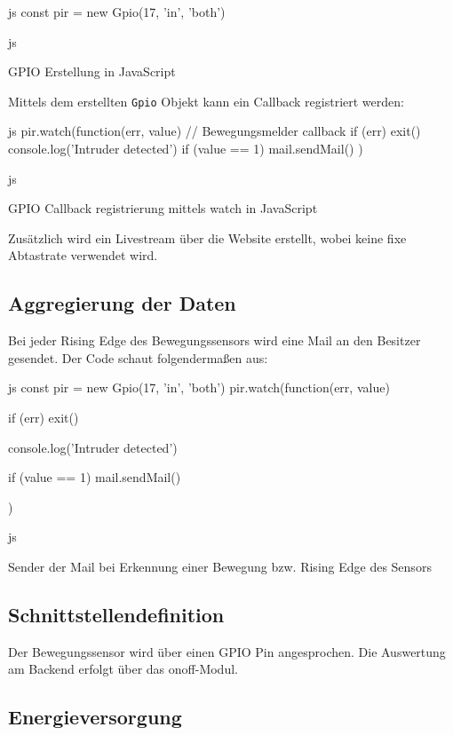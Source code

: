 \begin{listing}
    \begin{code}{js}
    const pir = new Gpio(17, 'in', 'both')
    \end{code}{js}
    \caption{GPIO Erstellung in JavaScript}
\end{listing}

Mittels dem erstellten \texttt{Gpio} Objekt kann ein Callback registriert werden:

\begin{listing}
    \begin{code}[firstnumber=last]{js}
    pir.watch(function(err, value) {
        // Bewegungsmelder callback
        if (err) exit()
        console.log('Intruder detected')
        if (value == 1) {
            mail.sendMail()
        }
    })
    \end{code}{js}
    \caption{GPIO Callback registrierung mittels watch in JavaScript}
\end{listing}

Zusätzlich wird ein Livestream über die Website erstellt, wobei keine fixe Abtastrate verwendet wird.

\clearpage
\subsection{Aggregierung der Daten}
Bei jeder Rising Edge des Bewegungssensors wird eine Mail an den Besitzer gesendet. Der Code schaut folgendermaßen aus:
\begin{listing}
    \begin{code}[firstnumber=last]{js}
    const pir = new Gpio(17, 'in', 'both')
    pir.watch(function(err, value) {
        if (err) exit()

        console.log('Intruder detected')

        if (value == 1) {
            mail.sendMail()
        }
    })
    \end{code}{js}
    \caption{Sender der Mail bei Erkennung einer Bewegung bzw. Rising Edge des Sensors}
\end{listing}

\subsection{Schnittstellendefinition}
Der Bewegungssensor wird über einen GPIO Pin angesprochen. Die Auswertung am Backend erfolgt über das onoff-Modul. \newline

\subsection{Energieversorgung}

